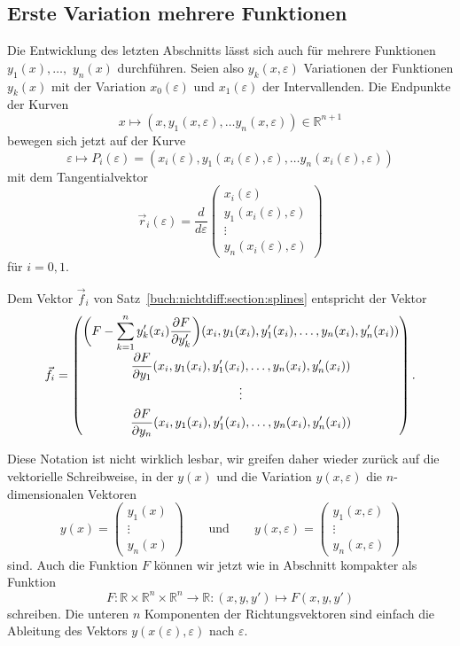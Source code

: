 %
%
\subsection{Erste Variation mehrere Funktionen
\label{buch:variation:allgemein:subsection:var1n}}
Die Entwicklung des letzten Abschnitts lässt sich auch für mehrere
Funktionen $y_1(x),\dots,$ $y_n(x)$ durchführen.
Seien also $y_k(x,\varepsilon)$ Variationen der Funktionen $y_k(x)$
mit der Variation $x_0(\varepsilon)$ und $x_1(\varepsilon)$ der 
Intervallenden.
Die Endpunkte der Kurven
\[
x
\mapsto
(x,
y_1(x,\varepsilon),\dots
y_n(x,\varepsilon))
\in \mathbb{R}^{n+1}
\]
bewegen sich jetzt auf der Kurve
\[
\varepsilon
\mapsto
P_i(\varepsilon)
=
(x_i(\varepsilon),
y_1(x_i(\varepsilon),\varepsilon),
\dots
y_n(x_i(\varepsilon),\varepsilon))
\]
mit dem Tangentialvektor
\[
\vec{r}_i(\varepsilon)
=
\frac{d}{d\varepsilon}
\begin{pmatrix}
x_i(\varepsilon)\\
y_1(x_i(\varepsilon),\varepsilon)\\
\vdots\\
y_n(x_i(\varepsilon),\varepsilon)
\end{pmatrix}
\]
für $i=0,1$.

Dem Vektor $\vec{f}_i$
von Satz~\ref{buch:nichtdiff:section:splines}
entspricht der Vektor
\[
\vec{f}_i
=
\renewcommand{\arraystretch}{1.8}
\begin{pmatrix}
\displaystyle
\biggl(
F%
-
\sum_{k=1}^n y'_k(x_i) \frac{\partial F}{\partial y_k'}
\biggr)
(x_i,y_1(x_i),y'_1(x_i),\dots,y_n(x_i),y_n'(x_i))
\\
\displaystyle
\frac{\partial F}{\partial y_1}
(x_i,y_1(x_i),y'_1(x_i),\dots,y_n(x_i),y_n'(x_i))
\\
\vdots
\\
\displaystyle
\frac{\partial F}{\partial y_n}
(x_i,y_1(x_i),y'_1(x_i),\dots,y_n(x_i),y_n'(x_i))
\end{pmatrix}.
\]

Diese Notation ist nicht wirklich lesbar, wir greifen daher wieder
zurück auf die vektorielle Schreibweise, in der 
$y(x)$ und die Variation $y(x,\varepsilon)$ die $n$-dimensionalen
Vektoren
\[
y(x)
=
\begin{pmatrix}
y_1(x)\\
\vdots\\
y_n(x)
\end{pmatrix}
\qquad
\text{und}
\qquad
y(x,\varepsilon)
=
\begin{pmatrix}
y_1(x,\varepsilon)\\
\vdots\\
y_n(x,\varepsilon)
\end{pmatrix}
\]
sind.
Auch die Funktion $F$ können wir jetzt wie in Abschnitt
kompakter als
Funktion
\[
F\colon
\mathbb{R}\times \mathbb{R}^n\times\mathbb{R}^n
\to
\mathbb{R}
:
(x,y,y')
\mapsto
F(x,y,y')
\]
schreiben.
Die unteren $n$ Komponenten der Richtungsvektoren sind einfach
die Ableitung des Vektors
$y(x(\varepsilon),\varepsilon)$ nach $\varepsilon$.

